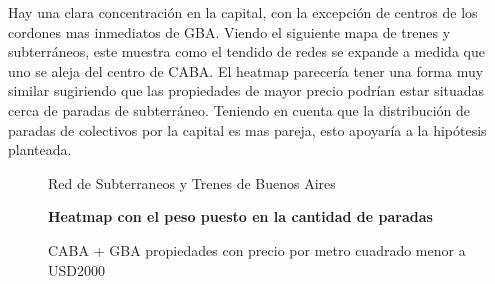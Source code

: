 \documentclass[a4paper, 10pt]{article}
\begin{document}
				
				Hay una clara concentración en la capital, con la excepción de centros de los cordones mas 
				inmediatos de GBA. Viendo el siguiente mapa de trenes y subterráneos, este muestra como 
				el tendido de redes se expande a medida que uno se aleja del centro de CABA. El heatmap 
				parecería tener una forma muy similar sugiriendo que las propiedades de mayor precio 
				podrían estar situadas cerca de paradas de subterráneo. Teniendo en cuenta que la 
				distribución de paradas de colectivos por la capital es mas pareja, esto apoyaría a 
				la hipótesis planteada.
				
				\begin{figure}[H]
    				\centering
    				\caption{Red de Subterraneos y Trenes de Buenos Aires}
				\end{figure}
				\begin{figure}[H]
    				\centering
    				\textbf{Heatmap con el peso puesto en la cantidad de paradas}\par\medskip
    				\caption{CABA + GBA propiedades con precio por metro cuadrado menor a \textdollar USD2000}
				\end{figure}
				
\end{document}
